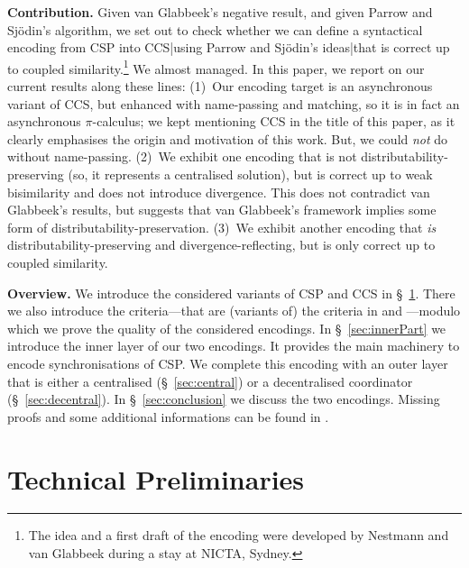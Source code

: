 \documentclass[copyright,creativecommons]{eptcs}
\begin{document}
\vspace{0.3em}
\noindent
\textbf{Contribution.}\;
Given van Glabbeek's negative result, and given Parrow and Sj\"odin's algorithm, we set out to check whether we can define a syntactical encoding from CSP into CCS|using Parrow and Sj\"odin's ideas|that is correct up to coupled similarity.\footnote{The idea and a first draft of the encoding were developed by Nestmann and van Glabbeek during a stay at NICTA, Sydney.} We almost managed. In this paper, we report on our current results along these lines: 
(1)~Our encoding target is an asynchronous variant of CCS, but enhanced with name-passing and matching, so it is in fact an asynchronous $\pi$-calculus; we kept mentioning CCS in the title of this paper, as it clearly emphasises the origin and motivation of this work. But, we could \emph{not} do without name-passing.
(2)~We exhibit one encoding that is not distributability-preserving (so, it represents a centralised solution), but is correct up to weak bisimilarity and does not introduce divergence. This does not contradict van Glabbeek's results, but suggests that van Glabbeek's framework implies some form of distributability-preservation.
(3)~We exhibit another encoding that \emph{is} distributability-preserving and divergence-reflecting, but is only correct up to coupled similarity.

\vspace{0.3em}
\noindent
\textbf{Overview.}\;
We introduce the considered variants of CSP and CCS in \S~\ref{sec:techPrel}. There we also introduce the criteria---that are (variants of) the criteria in \cite{gorla10} and \cite{petersNestmannGoltz13}---modulo which we prove the quality of the considered encodings. In \S~\ref{sec:innerPart} we introduce the inner layer of our two encodings. It provides the main machinery to encode synchronisations of CSP. We complete this encoding with an outer layer that is either a centralised (\S~\ref{sec:central}) or a decentralised coordinator (\S~\ref{sec:decentral}). In \S~\ref{sec:conclusion} we discuss the two encodings. Missing proofs and some additional informations can be found in \cite{hatzelTechRep15}.



\section{Technical Preliminaries}
\label{sec:techPrel}
\end{document}

